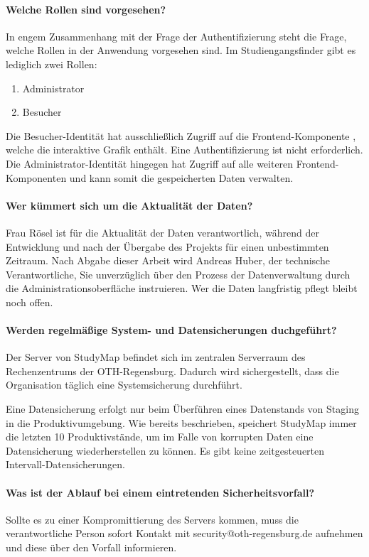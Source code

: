 \paragraph*{Welche Rollen sind vorgesehen?}
In engem Zusammenhang mit der Frage der Authentifizierung steht die Frage, welche Rollen in der Anwendung vorgesehen sind. Im Studiengangsfinder gibt es lediglich zwei Rollen:
\begin{enumerate}
    \item Administrator
    \item Besucher
\end{enumerate}
Die Besucher-Identität hat ausschließlich Zugriff auf die Frontend-Komponente , welche die interaktive Grafik enthält. Eine Authentifizierung ist nicht erforderlich. Die Administrator-Identität hingegen hat Zugriff auf alle weiteren Frontend-Komponenten und kann somit die gespeicherten Daten verwalten.

\paragraph*{Wer kümmert sich um die Aktualität der Daten?}
Frau Rösel ist für die Aktualität der Daten verantwortlich, während der Entwicklung und nach der Übergabe des Projekts für einen unbestimmten Zeitraum. Nach Abgabe dieser Arbeit wird Andreas Huber, der technische Verantwortliche, Sie unverzüglich über den Prozess der Datenverwaltung durch die Administrationsoberfläche instruieren. Wer die Daten langfristig pflegt bleibt noch offen.

\paragraph*{Werden regelmäßige System- und Datensicherungen duchgeführt?}
Der Server von StudyMap befindet sich im zentralen Serverraum des Rechenzentrums der OTH-Regensburg. Dadurch wird sichergestellt, dass die Organisation täglich eine Systemsicherung durchführt.

Eine Datensicherung erfolgt nur beim Überführen eines Datenstands von Staging in die Produktivumgebung. Wie bereits beschrieben, speichert StudyMap immer die letzten 10 Produktivstände, um im Falle von korrupten Daten eine Datensicherung wiederherstellen zu können. Es gibt keine zeitgesteuerten Intervall-Datensicherungen.

\paragraph*{Was ist der Ablauf bei einem eintretenden Sicherheitsvorfall?}
Sollte es zu einer Kompromittierung des Servers kommen, muss die verantwortliche Person sofort Kontakt mit security@oth-regensburg.de aufnehmen und diese über den Vorfall informieren.

